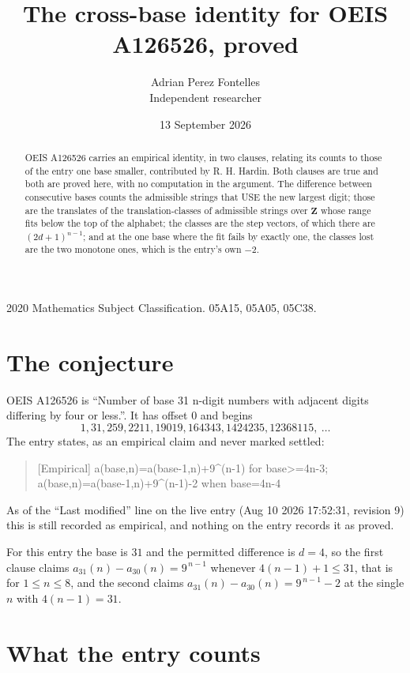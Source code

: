 \documentclass[11pt,a4paper]{article}
\title{The cross-base identity for OEIS A126526, proved}
\author{Adrian Perez Fontelles\\ \small Independent researcher}
\date{13 September 2026}
\theoremstyle{plain}
\theoremstyle{definition}
\begin{document}
\maketitle

\begin{abstract}
OEIS A126526 carries an empirical identity, in two clauses, relating its counts to those of the
entry one base smaller, contributed by R. H. Hardin. Both clauses are true and both are proved
here, with no computation in the argument. The difference between consecutive bases counts the
admissible strings that USE the new largest digit; those are the translates of the
translation-classes of admissible strings over $\mathbf{Z}$ whose range fits below the top of
the alphabet; the classes are the step vectors, of which there are $(2d+1)^{n-1}$; and at the
one base where the fit fails by exactly one, the classes lost are the two monotone ones, which
is the entry's own $-2$.
\end{abstract}

\noindent\small 2020 Mathematics Subject Classification. 05A15, 05A05, 05C38.\normalsize

\section{The conjecture}

OEIS A126526 is ``Number of base 31 n-digit numbers with adjacent digits differing by four or less.''. It has offset $0$ and begins
\[
1, 31, 259, 2211, 19019, 164343, 1424235, 12368115,\ \dots
\]
The entry states, as an empirical claim and never marked settled:
\begin{quote}
[Empirical] a(base,n)=a(base-1,n)+9\textasciicircum{}(n-1) for base>=4n-3; a(base,n)=a(base-1,n)+9\textasciicircum{}(n-1)-2 when base=4n-4
\end{quote}
As of the ``Last modified'' line on the live entry (Aug 10 2026 17:52:31, revision 9)
this is still recorded as empirical, and nothing on the entry records it as proved.

For this entry the base is $31$ and the permitted difference is $d=4$, so the first clause
claims $a_{31}(n)-a_{30}(n)=9^{\,n-1}$ whenever $4(n-1)+1\le31$, that is for
$1\le n\le8$, and the second claims $a_{31}(n)-a_{30}(n)=9^{\,n-1}-2$ at the single
$n$ with $4(n-1)=31$.

\section{What the entry counts}
\end{document}
